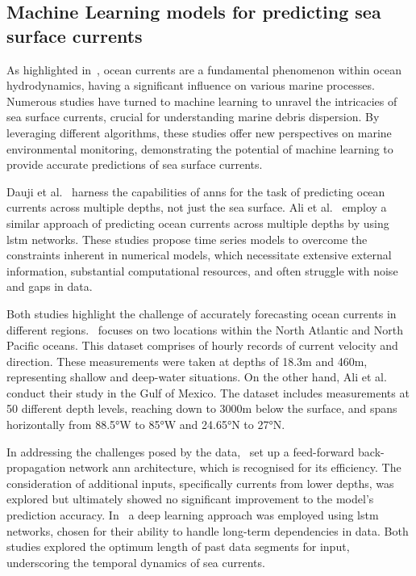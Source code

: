 \subsection{Machine Learning models for predicting sea surface currents}
\label{subsec:2.2.2}

As highlighted in~\cite{40}, ocean currents are a fundamental phenomenon within ocean hydrodynamics, having a significant influence on various marine processes. Numerous studies have turned to machine learning to unravel the intricacies of sea surface currents, crucial for understanding marine debris dispersion. By leveraging different algorithms, these studies offer new perspectives on marine environmental monitoring, demonstrating the potential of machine learning to provide accurate predictions of sea surface currents.\newline

Dauji et al.~\cite{41} harness the capabilities of \acrshort{ann}s for the task of predicting ocean currents across multiple depths, not just the sea surface. Ali et al.~\cite{42} employ a similar approach of predicting ocean currents across multiple depths by using \acrshort{lstm} networks. These studies propose time series models to overcome the constraints inherent in numerical models, which necessitate extensive external information, substantial computational resources, and often struggle with noise and gaps in data. 

Both studies highlight the challenge of accurately forecasting ocean currents in different regions.~\cite{41} focuses on two locations within the North Atlantic and North Pacific oceans. This dataset comprises of hourly records of current velocity and direction. These measurements were taken at depths of 18.3m and 460m, representing shallow and deep-water situations. On the other hand, Ali et al.~\cite{42} conduct their study in the Gulf of Mexico. The dataset includes measurements at 50 different depth levels, reaching down to 3000m below the surface, and spans horizontally from 88.5°W to 85°W and 24.65°N to 27°N.

In addressing the challenges posed by the data,~\cite{41} set up a feed-forward back-propagation network \acrshort{ann} architecture, which is recognised for its efficiency. The consideration of additional inputs, specifically currents from lower depths, was explored but ultimately showed no significant improvement to the model's prediction accuracy. In~\cite{42} a deep learning approach was employed using \acrshort{lstm} networks, chosen for their ability to handle long-term dependencies in data. Both studies explored the optimum length of past data segments for input, underscoring the temporal dynamics of sea currents.
	
